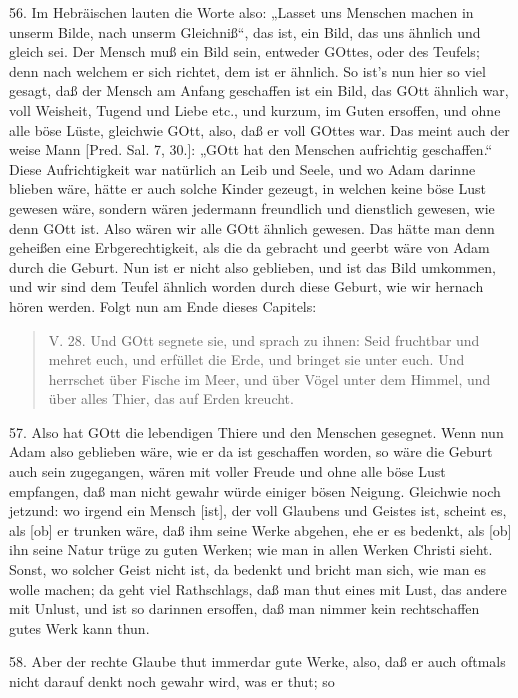 56. Im Hebräischen lauten die Worte also: „Lasset uns Menschen machen in unserm Bilde, nach unserm Gleichniß“, das ist, ein Bild, das uns ähnlich und gleich sei. Der Mensch muß ein Bild sein, entweder GOttes, oder des Teufels; denn nach welchem er sich richtet, dem ist er ähnlich. So ist’s nun hier so viel gesagt, daß der Mensch am Anfang geschaffen ist ein Bild, das GOtt ähnlich war, voll Weisheit, Tugend und Liebe etc., und kurzum, im Guten ersoffen, und ohne alle böse Lüste, gleichwie GOtt, also, daß er voll GOttes war. Das meint auch der weise Mann [Pred. Sal. 7, 30.]: „GOtt hat den Menschen aufrichtig geschaffen.“ Diese Aufrichtigkeit war natürlich an Leib und Seele, und wo Adam darinne blieben wäre, hätte er auch solche Kinder gezeugt, in welchen keine böse Lust gewesen wäre, sondern wären jedermann freundlich und dienstlich gewesen, wie denn GOtt ist. Also wären wir alle GOtt ähnlich gewesen. Das hätte man denn geheißen eine Erbgerechtigkeit, als die da gebracht und geerbt wäre von Adam durch die Geburt. Nun ist er nicht also geblieben, und ist das Bild umkommen, und wir sind dem Teufel ähnlich worden durch diese Geburt, wie wir hernach hören werden. Folgt nun am Ende dieses Capitels:

\begin{quote}
V. 28. Und GOtt segnete sie, und sprach zu ihnen: Seid fruchtbar und mehret euch, und erfüllet die Erde, und bringet sie unter euch. Und herrschet über Fische im Meer, und über Vögel unter dem Himmel, und über alles Thier, das auf Erden kreucht.
\end{quote}

57. Also hat GOtt die lebendigen Thiere und den Menschen gesegnet. Wenn nun Adam also geblieben wäre, wie er da ist geschaffen worden, so wäre die Geburt auch sein zugegangen, wären mit voller Freude und ohne alle böse Lust empfangen, daß man nicht gewahr würde einiger bösen Neigung. Gleichwie noch jetzund: wo irgend ein Mensch [ist], der voll Glaubens und Geistes ist, scheint es, als [ob] er trunken wäre, daß ihm seine Werke abgehen, ehe er es bedenkt, als [ob] ihn seine Natur trüge zu guten Werken; wie man in allen Werken Christi sieht. Sonst, wo solcher Geist nicht ist, da bedenkt und bricht man sich, wie man es wolle machen; da geht viel Rathschlags, daß man thut eines mit Lust, das andere mit Unlust, und ist so darinnen ersoffen, daß man nimmer kein rechtschaffen gutes Werk kann thun.

58. Aber der rechte Glaube thut immerdar gute Werke, also, daß er auch oftmals nicht darauf denkt noch gewahr wird, was er thut; so
